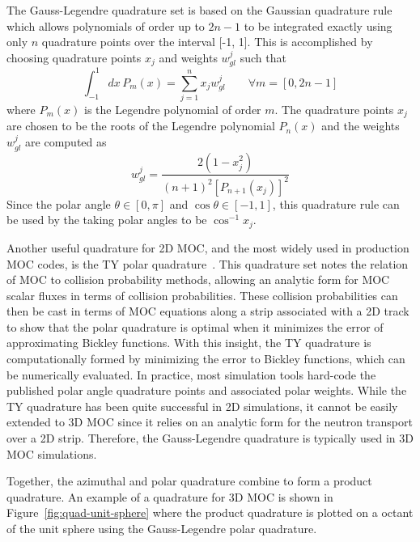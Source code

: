 The Gauss-Legendre quadrature set is based on the Gaussian quadrature rule which allows polynomials of order up to $2n-1$ to be integrated exactly using only $n$ quadrature points over the interval [-1, 1]. This is accomplished by choosing quadrature points $x_j$ and weights $w_{\textit{gl}}^j$ such that
\begin{equation}
\int_{-1}^{1} dx \, P_m(x) = \sum_{j=1}^n x_j w_{\textit{gl}}^j \qquad \forall m = [0, 2n-1]
\end{equation}
where $P_m(x)$ is the Legendre polynomial of order $m$. The quadrature points $x_j$ are chosen to be the roots of the Legendre polynomial $P_n(x)$ and the weights $w_{\textit{gl}}^j$ are computed as
\begin{equation}
w_{\textit{gl}}^j = \frac{2(1-x_j^2)}{(n+1)^2\left[P_{n+1}(x_j)\right]^2}
\end{equation}
Since the polar angle $\theta \in [0, \pi]$ and $\cos{\theta} \in [-1, 1]$, this quadrature rule can be used by the taking polar angles to be $\cos^{-1} x_j$.  

Another useful quadrature for 2D \ac{MOC}, and the most widely used in production \ac{MOC} codes, is the TY polar quadrature~\cite{ty-quadrature}. This quadrature set notes the relation of \ac{MOC} to collision probability methods, allowing an analytic form for \ac{MOC} scalar fluxes in terms of collision probabilities. These collision probabilities can then be cast in terms of \ac{MOC} equations along a strip associated with a 2D track to show that the polar quadrature is optimal when it minimizes the error of approximating Bickley functions. With this insight, the TY quadrature is computationally formed by minimizing the error to Bickley functions, which can be numerically evaluated. In practice, most simulation tools hard-code the published polar angle quadrature points and associated polar weights. While the TY quadrature has been quite successful in 2D simulations, it cannot be easily extended to 3D \ac{MOC} since it relies on an analytic form for the neutron transport over a 2D strip. Therefore, the Gauss-Legendre quadrature is typically used in 3D \ac{MOC} simulations. 

Together, the azimuthal and polar quadrature combine to form a product quadrature. An example of a quadrature for 3D MOC is shown in Figure~\ref{fig:quad-unit-sphere} where the product quadrature is plotted on a octant of the unit sphere using the Gauss-Legendre polar quadrature.

